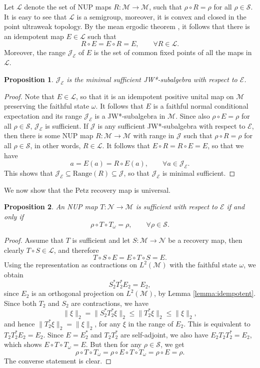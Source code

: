 \documentclass[12pt]{article}
\def\Ne{\mathcal N}
\def\Me{\mathcal M}
\def\Ee{\mathcal E}
\def\Le{\mathcal L}
\def\Je{\mathcal J}
\def\Se{\mathcal S}
\newtheorem{prop}{Proposition}
\theoremstyle{definition}
\theoremstyle{remark}
\begin{document}
Let $\Le$ denote the set of NUP maps $R:\Me\to \Me$, such that $\rho\circ R=\rho$ for all
$\rho\in \Se$. It is easy to see that $\Le$ is a semigroup, moreover, it is convex and
closed in the point ultraweak topology. By the mean ergodic theorem \cite{thomsen1985invariant}, it follows that
there is an idempotent map $E\in \Le$ such that
\[
R\circ E=E\circ R=E,\qquad \forall R\in \Le.
\]
Moreover, the range $\Je_\Ee$  of $E$ is the set of common fixed points of all the maps in $\Le$. 

\begin{prop} \label{prop:min_suf} 
    $\Je_\Ee$ is the  minimal sufficient JW*-subalgebra with respect to
$\Ee$.
\end{prop}

\begin{proof} Note that $E\in \Le$, so that it is an idempotent positive unital map on
$\Me$ 
preserving the faithful state $\omega$. It follows that $E$ is a faithful normal conditional expectation
and its range $\Je_\Ee$ is a JW*-subalgebra in $\Me$. Since also $\rho\circ
E=\rho$ for all $\rho\in \Se$, $\Je_\Ee$ is sufficient. If $\Je$ is any  sufficient
JW*-subalgebra with respect to $\Ee$, then there is some NUP map $R:\Me\to\Me$ with range in
$\Je$ such that $\rho\circ R=\rho$ for all $\rho\in \Se$, in other words, $R\in \Le$. It
follows that $E\circ R=R\circ E=E$, so that we have 
\[
a=E(a)=R\circ E(a),\qquad \forall a\in \Je_\Ee.
\]
This shows that $\Je_\Ee\subseteq \mathrm{Range}(R)\subseteq \Je$, so that $\Je_\Ee$ is minimal sufficient.


\end{proof}


We now show that the Petz recovery map is universal.

\begin{prop}\label{prop:universal} 
An NUP map  $T:\Ne\to \Me$ is  sufficient with respect
to $\Ee$ if and only if
\[
\rho\circ T\circ T_\omega=\rho,\qquad \forall \rho\in \Se.
\]

\end{prop}

\begin{proof} Assume that $T$ is sufficient and let $S:\Me\to \Ne$ be a recovery map, then
clearly $T\circ S\in \Le$, and therefore
\[
T\circ S\circ E=E\circ T\circ S=E.
\]
Using the representation as contractions on $L^2(\Me)$ with the faithful state $\omega$, we obtain
\[
S_2^*T_2^*E_2=E_2,
\]
since $E_2$ is an orthogonal projection on $L^2(\Me)$, by Lemma \ref{lemma:idempotent}. 
Since both $T_2$ and $S_2$ are contractions, we have 
\[
\|\xi\|_2=\|S_2^*T_2^*\xi\|_2\le \|T_2^*\xi\|_2\le \|\xi\|_2,
\]
and hence  $\|T_2^*\xi\|_2=\|\xi\|_2$, for any $\xi$ in the range of $E_2$. This is
equivalent to $T_2T_2^*E_2=E_2$. 
Since $E=E_2^*$ and $T_2T_2^*$ are self-adjoint, we also have $E_2T_2T_2^*=E_2$, which shows $E\circ T\circ T_\omega=E$. 
But then for
any $\rho\in \Se$, we get
\[
\rho\circ T\circ T_\omega=\rho\circ E\circ T\circ T_\omega=\rho\circ E=\rho.
\]
The converse statement is clear.

\end{proof}
\end{document}
